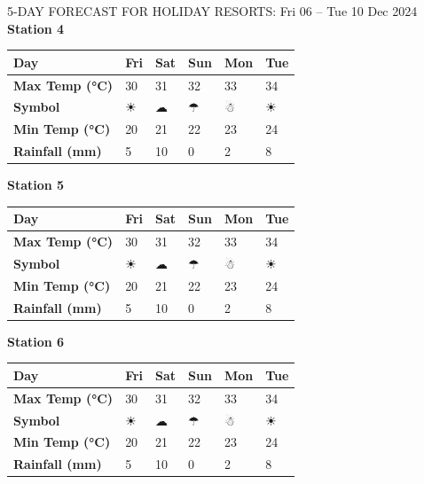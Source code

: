 \begin{frame}{5-DAY FORECAST FOR HOLIDAY RESORTS: Fri 06 – Tue 10 Dec 2024}
        \textbf{Station 4} \\
        \renewcommand{\arraystretch}{1.2} %
        \begin{tabular}{|p{2cm}|p{1.8cm}|p{1.8cm}|p{1.8cm}|p{1.8cm}|p{1.8cm}|}
        \hline
        \textbf{Day} & Fri & Sat & Sun & Mon & Tue \\ \hline
\textbf{Max Temp (°C)} & 30 & 31 & 32 & 33 & 34 \\ \hline
\textbf{Symbol} & ☀ & ☁ & ☂ & ☃ & ☀ \\ \hline
\textbf{Min Temp (°C)} & 20 & 21 & 22 & 23 & 24 \\ \hline
\textbf{Rainfall (mm)} & 5 & 10 & 0 & 2 & 8 \\ \hline
        \end{tabular}
        \vspace{0.5cm} %
        
        \textbf{Station 5} \\
        \renewcommand{\arraystretch}{1.2} %
        \begin{tabular}{|p{2cm}|p{1.8cm}|p{1.8cm}|p{1.8cm}|p{1.8cm}|p{1.8cm}|}
        \hline
        \textbf{Day} & Fri & Sat & Sun & Mon & Tue \\ \hline
\textbf{Max Temp (°C)} & 30 & 31 & 32 & 33 & 34 \\ \hline
\textbf{Symbol} & ☀ & ☁ & ☂ & ☃ & ☀ \\ \hline
\textbf{Min Temp (°C)} & 20 & 21 & 22 & 23 & 24 \\ \hline
\textbf{Rainfall (mm)} & 5 & 10 & 0 & 2 & 8 \\ \hline
        \end{tabular}
        \vspace{0.5cm} %
        
        \textbf{Station 6} \\
        \renewcommand{\arraystretch}{1.2} %
        \begin{tabular}{|p{2cm}|p{1.8cm}|p{1.8cm}|p{1.8cm}|p{1.8cm}|p{1.8cm}|}
        \hline
        \textbf{Day} & Fri & Sat & Sun & Mon & Tue \\ \hline
\textbf{Max Temp (°C)} & 30 & 31 & 32 & 33 & 34 \\ \hline
\textbf{Symbol} & ☀ & ☁ & ☂ & ☃ & ☀ \\ \hline
\textbf{Min Temp (°C)} & 20 & 21 & 22 & 23 & 24 \\ \hline
\textbf{Rainfall (mm)} & 5 & 10 & 0 & 2 & 8 \\ \hline
        \end{tabular}
        \vspace{0.5cm} %
        

\end{frame}
